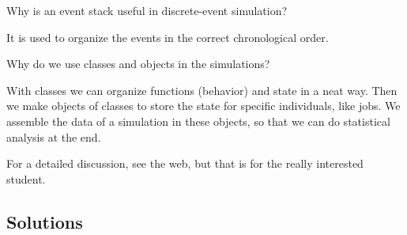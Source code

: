 \begin{exercise}[201904]
Why is an event stack useful in discrete-event simulation? 
\begin{solution}
 It is used to organize the events in the correct chronological order. 
\end{solution}
\end{exercise}


\begin{exercise}[201904]
 Why do we use classes and objects in the simulations?
\begin{solution}
 With classes we can organize functions (behavior) and state in a neat way.
 Then we make objects of classes to store the state for specific individuals, like jobs.
 We assemble the data of a simulation in these objects, so that we can do statistical analysis at the end.

 For a detailed discussion, see the web, but that is for the really interested student.
\end{solution}
\end{exercise}


\subsection*{Solutions}




